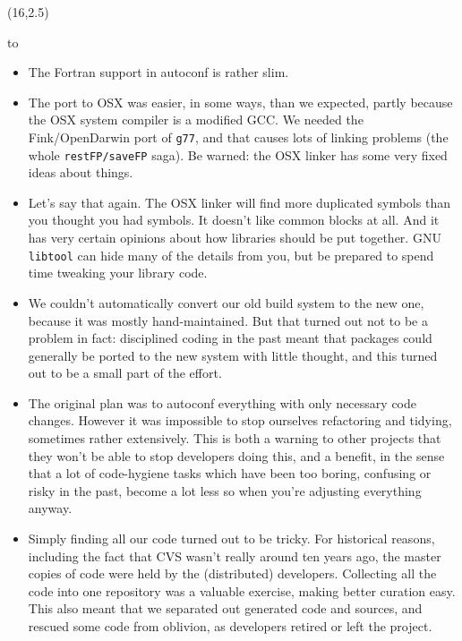 \documentclass[a0,portrait]{a0poster-ng}
\def\RHead#1{\noindent\hbox to \hsize{\hfil{\LARGE\color{DarkBlue} #1\par}}\bigskip}
\let\Head\RHead
\def\RHead#1{\noindent\hbox to \hsize{\hfil{\huge\color{DarkBlue} #1\par}}\bigskip}
\let\Head\RHead
\begin{document}
\begin{textblock}{7}(16,2.5)

\Head{Lessons and Warnings}

\begin{itemize}
\item The Fortran support in autoconf is rather slim.

\item The port to OSX was easier, in some ways, than we expected,
  partly because the OSX system compiler is a modified GCC.  We needed
  the Fink/OpenDarwin port of \texttt{g77}, and that causes lots of
  linking problems (the whole \texttt{restFP/saveFP} saga).  Be
  warned: the OSX linker has some very fixed ideas about things.

\item Let's say that again.  The OSX linker will find more duplicated
  symbols than you thought you had symbols.  It doesn't like common
  blocks at all.  And it has very certain opinions about how libraries
  should be put together.  GNU \texttt{libtool} can hide many of the
  details from you, but be prepared to spend time tweaking your library code.

\item We couldn't automatically convert our old build system to the
  new one, because it was mostly hand-maintained.  But that turned out
  not to be a problem in fact: disciplined coding in the past meant
  that packages could
  generally be ported to the new system with little thought, and this
  turned out to be a small part of the effort.

\item The original plan was to autoconf everything with only necessary
  code changes.  However it was impossible to stop ourselves
  refactoring and tidying, sometimes rather extensively.  This is
  both a warning to other projects that they won't be able to stop
  developers doing this, and a benefit, in the sense that a lot of
  code-hygiene tasks which have been too boring, confusing or risky in
  the past, become a lot less so when you're adjusting everything
  anyway.

\item Simply finding all our code turned out to be tricky.  For
  historical reasons, including the fact that CVS wasn't really around
  ten years ago, the master copies of code were held by the
  (distributed) developers.  Collecting all the code into one
  repository was a valuable exercise, making better curation easy.
  This also meant that we separated out generated code and sources, and
  rescued some code from oblivion, as developers retired or left the
  project.


\end{itemize}
\end{textblock}
\end{document}
